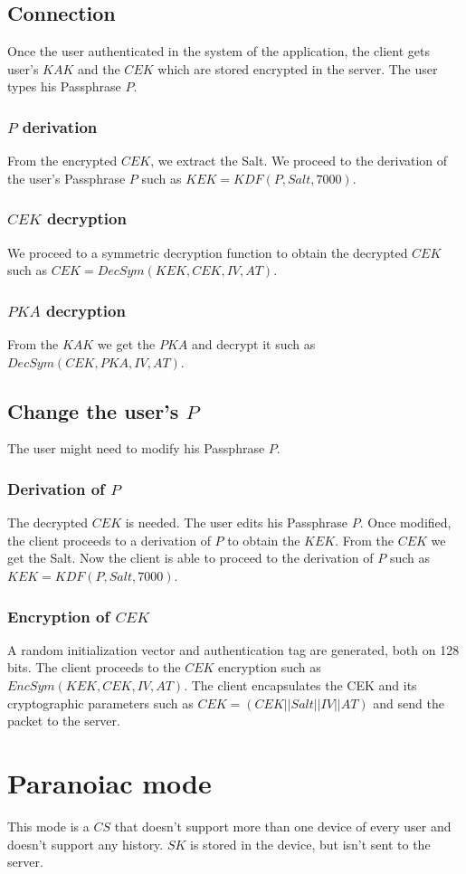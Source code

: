 \documentclass[a4paper,10pt]{article}
\begin{document}
\subsection{Connection}
Once the user authenticated in the system of the application, the client gets user's $KAK$ and the $CEK$ which are stored encrypted in the server. The user types his Passphrase $P$.
\subsubsection{$P$ derivation}
From the encrypted $CEK$, we extract the Salt. We proceed to the derivation of the user's Passphrase $P$ such as $KEK=KDF(P, Salt, 7000)$.
\subsubsection{$CEK$ decryption}
We proceed to a symmetric decryption function to obtain the decrypted $CEK$ such as $CEK=DecSym(KEK, CEK, IV,AT)$.
\subsubsection{$PKA$ decryption}
From the $KAK$ we get the $PKA$ and decrypt it such as $DecSym(CEK, PKA, IV, AT)$.

\subsection{Change the user's $P$}
The user might need to modify his Passphrase $P$.
\subsubsection{Derivation of $P$}
The decrypted $CEK$ is needed. The user edits his Passphrase $P$. Once modified, the client proceeds to a derivation of $P$ to obtain the $KEK$. From the $CEK$ we get the Salt. Now the client is able to proceed to the derivation of $P$ such as $KEK=KDF(P, Salt, 7000)$.
\subsubsection{Encryption of $CEK$}
A random initialization vector and authentication tag are generated, both on 128 bits. The client proceeds to the $CEK$ encryption such as $EncSym(KEK, CEK, IV, AT)$. The client encapsulates the CEK and its cryptographic parameters such as $CEK=(CEK||Salt||IV||AT)$ and send the packet to the server.

\section{Paranoiac mode}
This mode is a $CS$ that doesn't support more than one device of every user and doesn't support any history. $SK$ is stored in the device, but isn't sent to the server.
\end{document}
